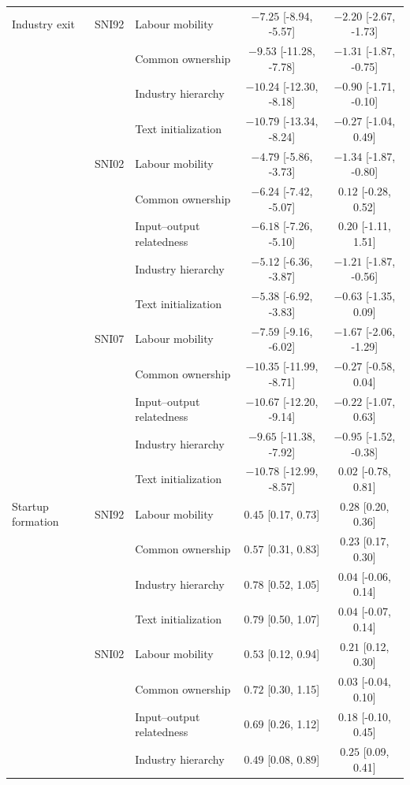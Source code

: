 \begin{table}[htbp]
\begin{tabular}{lllcc}
\midrule
Industry exit & SNI92 & Labour mobility & $-7.25$ [-8.94, -5.57] & $-2.20$ [-2.67, -1.73] \\
 &  & Common ownership & $-9.53$ [-11.28, -7.78] & $-1.31$ [-1.87, -0.75] \\
 &  & Industry hierarchy & $-10.24$ [-12.30, -8.18] & $-0.90$ [-1.71, -0.10] \\
 &  & Text initialization & $-10.79$ [-13.34, -8.24] & $-0.27$ [-1.04, 0.49] \\
\addlinespace[2pt]
 & SNI02 & Labour mobility & $-4.79$ [-5.86, -3.73] & $-1.34$ [-1.87, -0.80] \\
 &  & Common ownership & $-6.24$ [-7.42, -5.07] & $0.12$ [-0.28, 0.52] \\
 &  & Input--output relatedness & $-6.18$ [-7.26, -5.10] & $0.20$ [-1.11, 1.51] \\
 &  & Industry hierarchy & $-5.12$ [-6.36, -3.87] & $-1.21$ [-1.87, -0.56] \\
 &  & Text initialization & $-5.38$ [-6.92, -3.83] & $-0.63$ [-1.35, 0.09] \\
\addlinespace[2pt]
 & SNI07 & Labour mobility & $-7.59$ [-9.16, -6.02] & $-1.67$ [-2.06, -1.29] \\
 &  & Common ownership & $-10.35$ [-11.99, -8.71] & $-0.27$ [-0.58, 0.04] \\
 &  & Input--output relatedness & $-10.67$ [-12.20, -9.14] & $-0.22$ [-1.07, 0.63] \\
 &  & Industry hierarchy & $-9.65$ [-11.38, -7.92] & $-0.95$ [-1.52, -0.38] \\
 &  & Text initialization & $-10.78$ [-12.99, -8.57] & $0.02$ [-0.78, 0.81] \\
\midrule
Startup formation & SNI92 & Labour mobility & $0.45$ [0.17, 0.73] & $0.28$ [0.20, 0.36] \\
 &  & Common ownership & $0.57$ [0.31, 0.83] & $0.23$ [0.17, 0.30] \\
 &  & Industry hierarchy & $0.78$ [0.52, 1.05] & $0.04$ [-0.06, 0.14] \\
 &  & Text initialization & $0.79$ [0.50, 1.07] & $0.04$ [-0.07, 0.14] \\
\addlinespace[2pt]
 & SNI02 & Labour mobility & $0.53$ [0.12, 0.94] & $0.21$ [0.12, 0.30] \\
 &  & Common ownership & $0.72$ [0.30, 1.15] & $0.03$ [-0.04, 0.10] \\
 &  & Input--output relatedness & $0.69$ [0.26, 1.12] & $0.18$ [-0.10, 0.45] \\
 &  & Industry hierarchy & $0.49$ [0.08, 0.89] & $0.25$ [0.09, 0.41] \\

\end{tabular}
\end{table}
